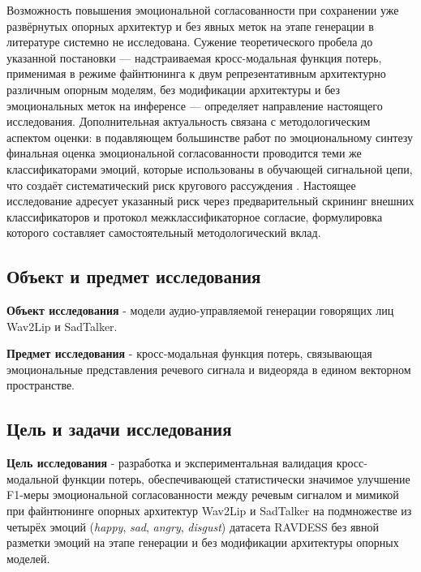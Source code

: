 \documentclass[a4paper, 12pt, oneside, openany]{article}
\begin{document}
Возможность повышения эмоциональной согласованности при сохранении уже развёрнутых опорных архитектур и без явных меток на этапе генерации в литературе системно не исследована. Сужение теоретического пробела до указанной постановки --- надстраиваемая кросс-модальная функция потерь, применимая в режиме файнтюнинга к двум репрезентативным архитектурно различным опорным моделям, без модификации архитектуры и без эмоциональных меток на инференсе --- определяет направление настоящего исследования. Дополнительная актуальность связана с методологическим аспектом оценки: в подавляющем большинстве работ по эмоциональному синтезу финальная оценка эмоциональной согласованности проводится теми же классификаторами эмоций, которые использованы в обучающей сигнальной цепи, что создаёт систематический риск кругового рассуждения \cite{jiang2024survey}. Настоящее исследование адресует указанный риск через предварительный скрининг внешних классификаторов и протокол межклассификаторное согласие, формулировка которого составляет самостоятельный методологический вклад.

\subsection{Объект и предмет исследования}

\textbf{Объект исследования} - модели аудио-управляемой генерации говорящих лиц Wav2Lip и SadTalker.

\textbf{Предмет исследования} - кросс-модальная функция потерь, связывающая эмоциональные представления речевого сигнала и видеоряда в едином векторном пространстве.

\subsection{Цель и задачи исследования}

\textbf{Цель исследования} - разработка и экспериментальная валидация кросс-модальной функции потерь, обеспечивающей статистически значимое улучшение F1-меры эмоциональной согласованности между речевым сигналом и мимикой при файнтюнинге опорных архитектур Wav2Lip и SadTalker на подмножестве из четырёх эмоций (\textit{happy}, \textit{sad}, \textit{angry}, \textit{disgust}) датасета RAVDESS без явной разметки эмоций на этапе генерации и без модификации архитектуры опорных моделей.
\end{document}

